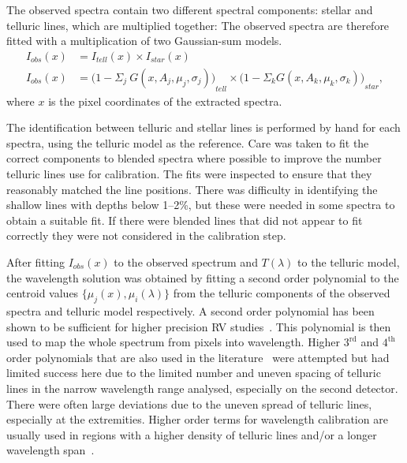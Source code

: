 The observed spectra contain two different spectral components: stellar and telluric lines, which are multiplied together: The observed spectra are therefore fitted with a multiplication of two Gaussian-sum models.
\begin{align}
I_{obs}(x) &= {I}_{tell}(x) \times {I}_{star}(x) \nonumber\\
I_{obs}(x) &= {\Big(1 - {\Sigma}_{j}\ G(x, A_{j}, {\mu}_{j}, {\sigma}_{j})\Big)}_{tell} \times {\Big(1 - {\Sigma}_{k} G(x, A_{k}, {\mu}_{k}, {\sigma}_{k})\Big)}_{star}, \label{eqn:obs}
\end{align}
where \(x\) is the pixel coordinates of the extracted spectra.

The identification between telluric and stellar lines is performed by hand for each spectra, using the telluric model as the reference.
Care was taken to fit the correct components to blended spectra where possible to improve the number telluric lines use for calibration.
The fits were inspected to ensure that they reasonably matched the line positions.
There was difficulty in identifying the shallow lines with depths below 1--2\%, but these were needed in some spectra to obtain a suitable fit.
If there were blended lines that did not appear to fit correctly they were not considered in the calibration step.

After fitting \(I_{obs}(x)\) to the observed spectrum and \(T(\lambda)\) to the telluric model, the wavelength solution was obtained by fitting a second order polynomial to the centroid values \(\{\mu_{j}(x), \mu_{i}(\lambda)\}\) from the telluric components of the observed spectra and telluric model respectively.
A second order polynomial has been shown to be sufficient for higher precision {RV} studies~\citep[e.g.][]{bean_groundbased_2010, figueira_radial_2010}.
This polynomial is then used to map the whole spectrum from pixels into wavelength.
Higher \(3^{\textrm{rd}}\) and \(4^{\textrm{th}}\) order polynomials that are also used in the literature~\citep[e.g.][]{seifahrt_synthesising_2010, ulmer-moll_telluric_2018} were attempted but had limited success here due to the limited number and uneven spacing of telluric lines in the narrow wavelength range analysed, especially on the second detector.
There were often large deviations due to the uneven spread of telluric lines, especially at the extremities.
Higher order terms for wavelength calibration are usually used in regions with a higher density of telluric lines and/or a longer wavelength span~\citep{piskorz_evidence_2016, seifahrt_synthesising_2010, ulmer-moll_telluric_2018}.

